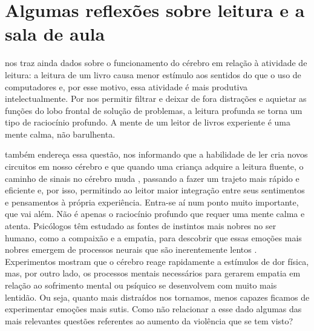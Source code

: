 \section{Algumas reflexões sobre leitura e a sala de aula}\label{sec-algumasreflexoessobreleituraeasaladeaula}


\textcite[p. 123]{carr2010} nos traz ainda dados sobre o funcionamento do cérebro em relação à atividade de leitura: a leitura de um livro causa menor estímulo aos sentidos do que o uso de computadores e, por esse motivo, essa atividade é mais produtiva intelectualmente. Por nos permitir filtrar e deixar de fora distrações e aquietar as funções do lobo frontal de solução de problemas, a leitura profunda se torna um tipo de raciocínio profundo. A mente de um leitor de livros experiente é uma mente calma, não barulhenta. 

\textcite{wolf2019} também endereça essa questão, nos informando que a habilidade de ler cria novos circuitos em nosso cérebro e que quando uma criança adquire a leitura fluente, o caminho de sinais no cérebro muda \cite{bbc2021}, passando a fazer um trajeto mais rápido e eficiente e, por isso, permitindo ao leitor maior integração entre seus sentimentos e pensamentos à própria experiência. Entra-se aí num ponto muito importante, que vai além. Não é apenas o raciocínio profundo que requer uma mente calma e atenta. Psicólogos têm estudado as fontes de instintos mais nobres no ser humano, como a compaixão e a empatia, para descobrir que essas emoções mais nobres emergem de processos neurais que são inerentemente lentos \cite[p. 220]{carr2010}. Experimentos mostram que o cérebro reage rapidamente a estímulos de dor física, mas, por outro lado, os processos mentais necessários para gerarem empatia em relação ao sofrimento mental ou psíquico se desenvolvem com muito mais lentidão. Ou seja, quanto mais distraídos nos tornamos, menos capazes ficamos de experimentar emoções mais sutis. Como não relacionar a esse dado algumas das mais relevantes questões referentes ao aumento da violência que se tem visto?

